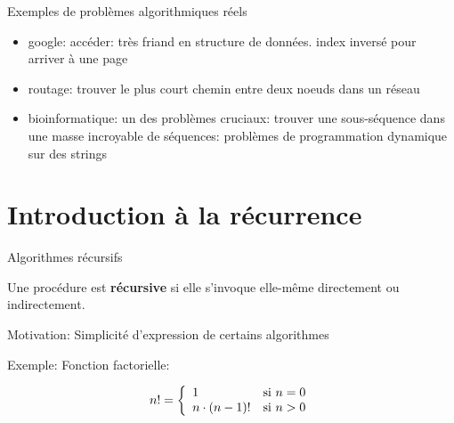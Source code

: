 \begin{frame}{Exemples de problèmes algorithmiques réels}

\begin{itemize}
\item google: accéder: très friand en structure de données. index inversé pour arriver à une page
\item routage: trouver le plus court chemin entre deux noeuds dans un réseau
\item bioinformatique: un des problèmes cruciaux: trouver une sous-séquence dans une masse incroyable de séquences: problèmes de programmation dynamique sur des strings
\end{itemize}

\end{frame}

\section{Introduction à la récurrence}



\begin{frame}{Algorithmes récursifs}

Une procédure est {\bf récursive} si elle s'invoque elle-même
directement ou indirectement.

\bigskip

Motivation: Simplicité d'expression de certains algorithmes

\bigskip

Exemple: Fonction factorielle:

\[n!=\left\{\begin{array}{ll}
1 &\mbox{si }n=0\\
n \cdot (n-1)! &\mbox{si }n>0$$
\end{array}
\right.
\]

\begin{center}
\end{center}

\end{frame}

